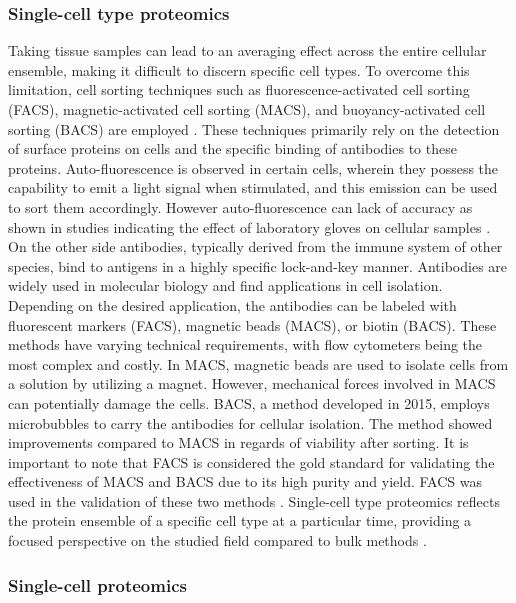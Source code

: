 \documentclass[
  11pt,
]{article}
\begin{document}
\hypertarget{single-cell-type-proteomics}{%
\subsubsection{Single-cell type proteomics}\label{single-cell-type-proteomics}}

Taking tissue samples can lead to an averaging effect across the entire cellular ensemble, making it difficult to discern specific cell types. To overcome this limitation, cell sorting techniques such as fluorescence-activated cell sorting (FACS), magnetic-activated cell sorting (MACS), and buoyancy-activated cell sorting (BACS) are employed \citep{Liou2015}. These techniques primarily rely on the detection of surface proteins on cells and the specific binding of antibodies to these proteins. Auto-fluorescence is observed in certain cells, wherein they possess the capability to emit a light signal when stimulated, and this emission can be used to sort them accordingly. However auto-fluorescence can lack of accuracy as shown in studies indicating the effect of laboratory gloves on cellular samples \citep{Philpott2017}. On the other side antibodies, typically derived from the immune system of other species, bind to antigens in a highly specific lock-and-key manner. Antibodies are widely used in molecular biology and find applications in cell isolation. Depending on the desired application, the antibodies can be labeled with fluorescent markers (FACS), magnetic beads (MACS), or biotin (BACS). These methods have varying technical requirements, with flow cytometers being the most complex and costly. In MACS, magnetic beads are used to isolate cells from a solution by utilizing a magnet. However, mechanical forces involved in MACS can potentially damage the cells. BACS, a method developed in 2015, employs microbubbles to carry the antibodies for cellular isolation. The method showed improvements compared to MACS in regards of viability after sorting.
It is important to note that FACS is considered the gold standard for validating the effectiveness of MACS and BACS due to its high purity and yield. FACS was used in the validation of these two methods \citep{Liou2015, Sutermaster2019}. Single-cell type proteomics reflects the protein ensemble of a specific cell type at a particular time, providing a focused perspective on the studied field compared to bulk methods \citep{Maes2020}.

\hypertarget{single-cell-proteomics}{%
\subsubsection{Single-cell proteomics}\label{single-cell-proteomics}}
\end{document}
